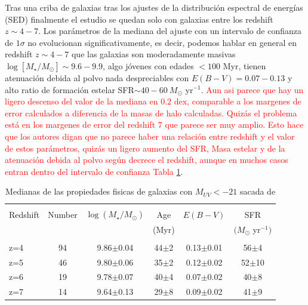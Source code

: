 \documentclass{article}
\begin{document}
Tras una criba de galaxias tras los ajustes de la distribución espectral de energías (SED) finalmente el estudio se quedan solo con galaxias entre los redshift $z\sim 4-7$. Los parámetros de la mediana del ajuste con un intervalo de confianza de $1\sigma$ no evolucionan significativamente, es decir, podemos hablar en general en redshift $z\sim 4-7$ que las galaxias son moderadamente masivas $\log[M_\star/M_\odot]\sim 9.6-9.9$, algo jóvenes con edades $<100$ Myr, tienen atenuación debida al polvo nada despreciables con $E(B-V)=0.07-0.13$ y alto ratio de formación estelar SFR$\sim 40-60\ M_\odot$ yr$^{-1}$. \textcolor{red}{Aun asi parece que hay un ligero descenso del valor de la mediana en $0.2$ dex, comparable a los margenes de error calculados a diferencia de la masas de halo calculadas. Quizás el problema está en los margenes de error del redshift $7$ que parece ser muy amplio. Esto hace que los autores digan que no parece haber una relación entre redshift y el valor de estos parámetros, quizás un ligero aumento del SFR, Masa estelar y de la atenuación debida al polvo según decrece el redshift, aunque en muchos casos entran dentro del intervalo de confianza Tabla \ref{tab:finkelstein1}}.\\

\begin{table}[h]
\begin{center}
\begin{tabular}{lccccc}
\hline \hline\\
Redshift & Number & $\log(M_\star/M_\odot)$ & Age & $E(B-V)$ & SFR\\
	&	&	&	(Myr)	&	& $(M_\odot$ yr$^{-1})$\\
\hline\\
z=4 & 94 & 9.86$\pm$0.04 & 44$\pm$2 & 0.13$\pm$0.01 & 56$\pm$4\\
z=5 & 46 & 9.80$\pm$0.06 & 35$\pm$2 & 0.12$\pm$0.02 & 52$\pm$10\\
z=6 & 19 & 9.78$\pm$0.07 & 40$\pm$4 & 0.07$\pm$0.02 & 40$\pm$8\\
z=7 & 14 & 9.64$\pm$0.13 & 29$\pm$8 & 0.09$\pm$0.02 & 41$\pm$9\\
\hline
\end{tabular}
\caption{\label{tab:finkelstein1} Medianas de las propiedades fisicas de galaxias con $M_{UV}<-21$ sacada de \cite{finkelstein2015increasing}}
\end{center}
\end{table}
\end{document}
